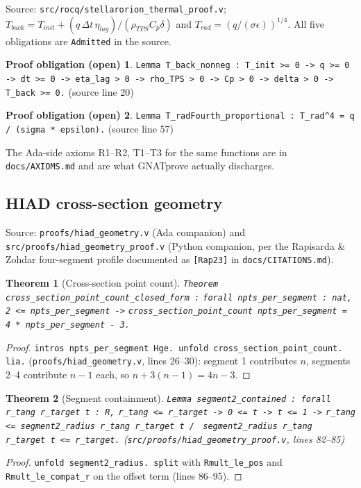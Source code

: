 \documentclass[11pt]{article}
\newtheorem{theorem}{Theorem}
\theoremstyle{definition}
\newtheorem*{obligation}{Proof obligation (open)}
\begin{document}
Source: \texttt{src/rocq/stellarorion\_thermal\_proof.v};
$T_{back} = T_{init} + (q\,\Delta t\,\eta_{lag})/(\rho_{TPS} C_p \delta)$
and $T_{rad} = (q/(\sigma\epsilon))^{1/4}$. All five obligations are
\texttt{Admitted} in the source.

\begin{obligation}
\texttt{Lemma T\_back\_nonneg : T\_init >= 0 -> q >= 0 -> dt >= 0 -> eta\_lag > 0 -> rho\_TPS > 0 -> Cp > 0 -> delta > 0 -> T\_back >= 0.}
(source line 20)
\end{obligation}

\begin{obligation}
\texttt{Lemma T\_radFourth\_proportional : T\_rad\^{}4 = q / (sigma * epsilon).}
(source line 57)
\end{obligation}

The Ada-side axioms R1--R2, T1--T3 for the same functions are in
\texttt{docs/AXIOMS.md} and are what GNATprove actually discharges.

\subsection{HIAD cross-section geometry}\label{sec:hiad}

Source: \texttt{proofs/hiad\_geometry.v} (Ada companion) and
\texttt{src/proofs/hiad\_geometry\_proof.v} (Python companion, per the
Rapisarda \& Zohdar four-segment profile documented as \texttt{[Rap23]} in
\texttt{docs/CITATIONS.md}).

\begin{theorem}[Cross-section point count]\label{thm:hiad-count}
\texttt{Theorem cross\_section\_point\_count\_closed\_form :}
\texttt{forall npts\_per\_segment : nat, 2 <= npts\_per\_segment ->}
\texttt{cross\_section\_point\_count npts\_per\_segment = 4 * npts\_per\_segment - 3.}
\end{theorem}
\begin{proof}
\verb|intros npts_per_segment Hge. unfold cross_section_point_count. lia.|
(\texttt{proofs/hiad\_geometry.v}, lines 26--30): segment 1 contributes
$n$, segments 2--4 contribute $n-1$ each, so $n + 3(n-1) = 4n - 3$.
\end{proof}

\begin{theorem}[Segment containment]\label{thm:seg2}
\texttt{Lemma segment2\_contained : forall r\_tang r\_target t : R,}
\texttt{r\_tang <= r\_target -> 0 <= t -> t <= 1 ->}
\texttt{r\_tang <= segment2\_radius r\_tang r\_target t /\ }
\texttt{segment2\_radius r\_tang r\_target t <= r\_target.}
(\texttt{src/proofs/hiad\_geometry\_proof.v}, lines 82--85)
\end{theorem}
\begin{proof}
\verb|unfold segment2_radius. split| with \verb|Rmult_le_pos| and
\verb|Rmult_le_compat_r| on the offset term (lines 86--95).
\end{proof}
\end{document}
